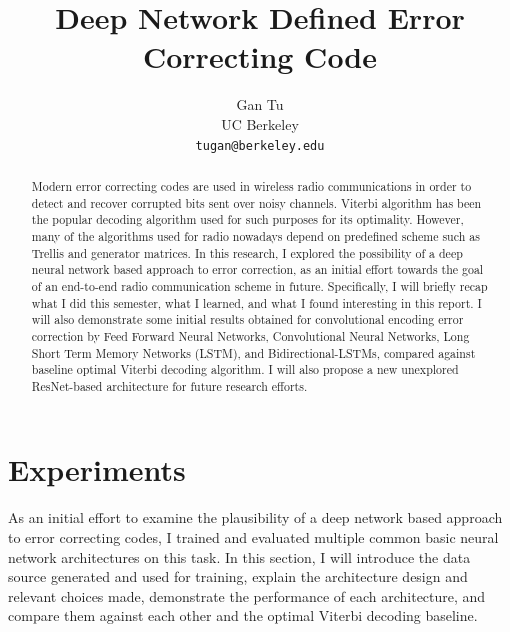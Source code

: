 \documentclass[10pt,twocolumn,letterpaper]{article}
\begin{document}
\title{Deep Network Defined Error Correcting Code}

\author{Gan Tu\\
UC Berkeley\\
{\tt\small tugan@berkeley.edu}
}

\maketitle

\begin{abstract}
   Modern error correcting codes are used in wireless radio communications in order to detect and recover corrupted bits sent over noisy channels. Viterbi algorithm has been the popular decoding algorithm used for such purposes for its optimality. However, many of the algorithms used for radio nowadays depend on predefined scheme such as Trellis and generator matrices. In this research, I explored the possibility of a deep neural network based approach to error correction, as an initial effort towards the goal of an end-to-end radio communication scheme in future. Specifically, I will briefly recap what I did this semester, what I learned, and what I found interesting in this report. I will also demonstrate some initial results obtained for convolutional encoding error correction by Feed Forward Neural Networks, Convolutional Neural Networks, Long Short Term Memory Networks (LSTM), and Bidirectional-LSTMs, compared against baseline optimal Viterbi decoding algorithm. I will also propose a new unexplored ResNet-based architecture for future research efforts.
\end{abstract}


\section{Experiments}

As an initial effort to examine the plausibility of a deep network based approach to error correcting codes, I trained and evaluated multiple common basic neural network architectures on this task. In this section, I will introduce the data source generated and used for training, explain the architecture design and relevant choices made, demonstrate the performance of each architecture, and compare them against each other and the optimal Viterbi decoding baseline.
\end{document}
